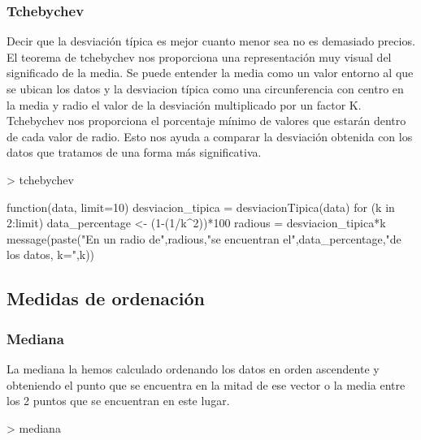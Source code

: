 \documentclass [a4paper] {article}
\begin{document}
\subsubsection{Tchebychev}
Decir que la desviación típica es mejor cuanto menor sea no es demasiado precios.
El teorema de tchebychev nos proporciona una representación muy visual del significado de la media.
Se puede entender la media como un valor entorno al que se ubican los datos y la desviacion típica como una circunferencia con centro en la media y radio el valor de la desviación multiplicado por un factor K.
Tchebychev nos proporciona el porcentaje mínimo de valores que estarán dentro de cada valor de radio.
Esto nos ayuda a comparar la desviación obtenida con los datos que tratamos de una forma más significativa.
\begin{Schunk}
\begin{Sinput}
> tchebychev
\end{Sinput}
\begin{Soutput}
function(data, limit=10){
  desviacion_tipica = desviacionTipica(data)
  for (k in 2:limit){
    data_percentage <- (1-(1/k^2))*100
    radious = desviacion_tipica*k
    message(paste("En un radio de",radious,"se encuentran el",data_percentage,"de los datos, k=",k))
  }
}
\end{Soutput}
\end{Schunk}

\subsection{Medidas de ordenación}
\subsubsection{Mediana}
La mediana la hemos calculado ordenando los datos en orden ascendente 
y obteniendo el punto que se encuentra en la mitad de ese vector 
o la media entre los 2 puntos que se encuentran en este lugar.
\begin{Schunk}
\begin{Sinput}
> mediana
\end{Sinput}
\end{Schunk}
\end{document}

